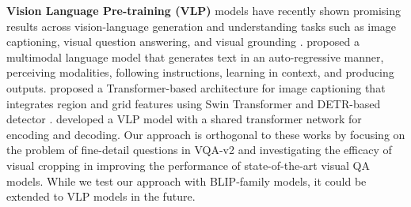 

\textbf{Vision Language Pre-training (VLP)} models have recently shown promising results across vision-language generation and understanding tasks such as image captioning, visual question answering, and visual grounding \citep{hossain2019comprehensive}. \cite{huang2023language} proposed a multimodal language model that generates text in an auto-regressive manner, perceiving modalities, following instructions, learning in context, and producing outputs. \cite{nguyen2022grit} proposed a Transformer-based architecture for image captioning that integrates region and grid features using Swin Transformer \citep{liu2021swin} and DETR-based detector \citep{carion2020end}.
\cite{zhou2020unified} developed a VLP model with a shared transformer network for encoding and decoding. 
Our approach is orthogonal to these works by focusing on the problem of fine-detail questions in VQA-v2 and investigating the efficacy of visual cropping in improving the performance of state-of-the-art visual QA models. While we test our approach with BLIP-family models, it could be extended to VLP models in the future.

